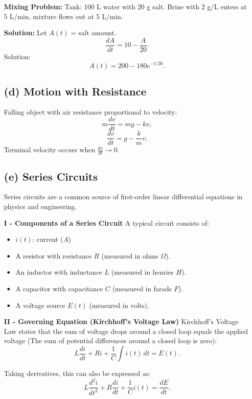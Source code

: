   

  \begin{example}
    \textbf{Mixing Problem:}
    Tank: 100 L water with 20 g salt. Brine with 2 g/L enters at 5 L/min, mixture flows out at 5 L/min.

    \textbf{Solution:}
    Let $A(t)$ = salt amount.
    \[
    \frac{dA}{dt} = 10 - \frac{A}{20}.
    \]
    Solution:
    \[
    A(t) = 200 - 180e^{-t/20}.
    \]
  \end{example}


\subsection*{(d) Motion with Resistance}
  Falling object with air resistance proportional to velocity:
  \[
  m\frac{dv}{dt} = mg - kv,
  \]
  \[
  \frac{dv}{dt} = g - \frac{k}{m}v.
  \]
  Terminal velocity occurs when $\tfrac{dv}{dt} \to 0$.


\subsection*{(e) Series Circuits}
  Series circuits are a common source of first-order linear differential equations in physics and engineering.

  \textbf{I - Components of a Series Circuit}
  A typical circuit consists of:
  \begin{itemize}
      \item \(i(t)\): current ($A$)
      \item A resistor with resistance $R$ (measured in ohms $\Omega$).
      \item An inductor with inductance $L$ (measured in henries $H$).
      \item A capacitor with capacitance $C$ (measured in farads $F$).
      \item A voltage source $E(t)$ (measured in volts).
  \end{itemize}

  \textbf{II - Governing Equation (Kirchhoff’s Voltage Law)}
  Kirchhoff’s Voltage Law states that the sum of voltage drops around a closed loop equals the applied voltage (The sum of potential differences around a closed loop is zero):
  \[
  L \frac{di}{dt} + Ri + \frac{1}{C} \int i(t)\,dt = E(t).
  \]

  \noindent Taking derivatives, this can also be expressed as:
  \[
  L \frac{d^2 i}{dt^2} + R \frac{di}{dt} + \frac{1}{C} i(t) = \frac{dE}{dt}.
  \]

